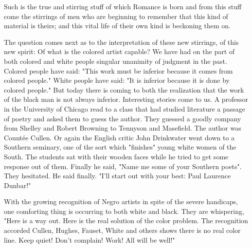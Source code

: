 \documentclass[12pt]{article}
\begin{document}
{\duboispara}%
Such is the true and stirring stuff of which Romance is born and from this stuff come the stirrings of men who are beginning to remember that this kind of material is theirs; and this vital life of their own kind is beckoning them on. 

{\duboispara}%
The question comes next as to the interpretation of these new stirrings, of this new spirit: Of what is the colored artist capable? We have had on the part of both colored and white people singular unanimity of judgment in the past. Colored people have said: "This work must be inferior because it comes from colored people." White people have said: "It is inferior because it is done by colored people." But today there is coming to both the realization that the work of the black man is not always inferior. Interesting stories come to us. A professor in the University of Chicago read to a class that had studied literature a passage of poetry and asked them to guess the author. They guessed a goodly company from Shelley and Robert Browning to Tennyson and Masefield. The author was Count\'{e}e Cullen. Or again the English critic John Drinkwater went down to a Southern seminary, one of the sort which "finishes" young white women of the South. The students sat with their wooden faces while he tried to get some response out of them. Finally he said, "Name me some of your Southern poets". They hesitated. He said finally. "I'll start out with your best: Paul Laurence Dunbar!"  


{\duboispara}%
With the growing recognition of Negro artists in spite of the severe handicaps, one comforting thing is occurring to both white and black. They are whispering, "Here is a way out. Here is the real solution of the color problem. The recognition accorded Cullen, Hughes, Fauset, White and others shows there is no real color line. Keep quiet! Don't complain! Work! All will be well!" 

\end{document}
